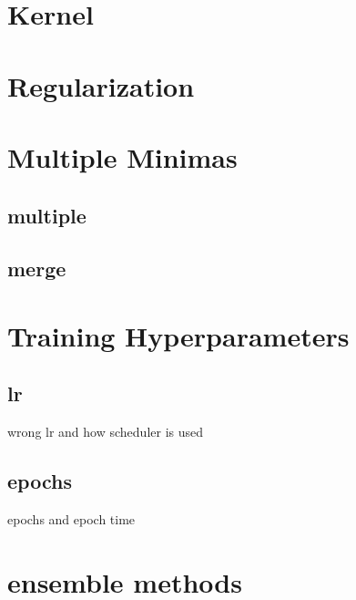 \section{Kernel}\label{res:Kernel}

\section{Regularization}

\section{Multiple Minimas}\label{res:Multiple}
\subsection{multiple}
\subsection{merge}

\section{Training Hyperparameters}\label{res:Training}
\subsection{lr}\label{res:Learning rate}
wrong lr and how scheduler is used
\subsection{epochs}\label{res:Epochs}
epochs and epoch time

\section{ensemble methods}
